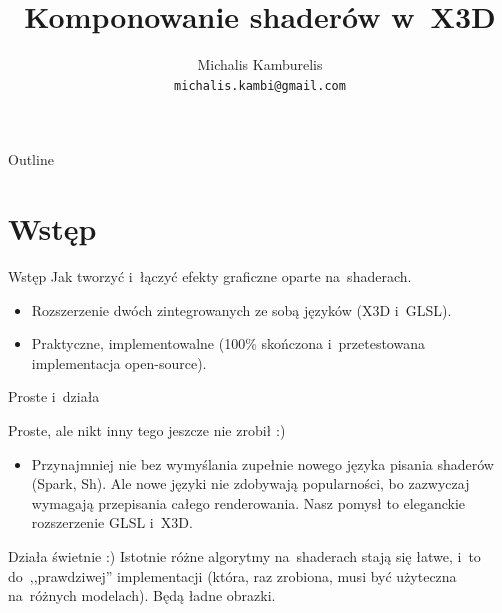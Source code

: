 \documentclass{beamer}
\title{Komponowanie shaderów w~X3D}
\author[Michalis Kamburelis]{Michalis Kamburelis \\ \texttt{michalis.kambi@gmail.com}}
\begin{document}
{
  \begin{frame}
    \titlepage
  \end{frame}
}

\begin{frame}{Outline}
  \tableofcontents
\end{frame}

\section{Wstęp}

\begin{frame}{Wstęp}
Jak tworzyć i~łączyć efekty graficzne oparte na~shaderach.

\begin{itemize}
  \item Rozszerzenie dwóch zintegrowanych ze sobą języków (X3D i~GLSL).
  \item Praktyczne, implementowalne (100\% skończona
    i~przetestowana implementacja open-source).
\end{itemize}
\end{frame}

\begin{frame}{Proste i~działa}

Proste, ale nikt inny tego jeszcze nie zrobił :)

\begin{itemize}
  \item Przynajmniej nie bez wymyślania zupełnie nowego języka pisania shaderów
    (Spark, Sh). Ale nowe języki nie zdobywają popularności,
    bo zazwyczaj wymagają przepisania całego renderowania.
    Nasz pomysł to eleganckie rozszerzenie GLSL i~X3D.
\end{itemize}

Działa świetnie :) Istotnie różne algorytmy na~shaderach stają się łatwe,
i~to do~,,prawdziwej'' implementacji (która, raz zrobiona,
musi być użyteczna na~różnych modelach).
Będą ładne obrazki.


\end{frame}
\end{document}
